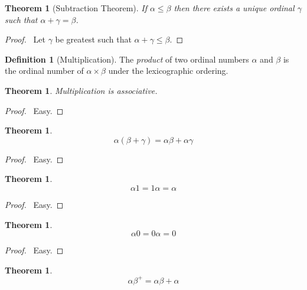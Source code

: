 \documentclass{report}
\let\qed\relax
\newtheorem{theorem}[axiom]{Theorem}
\theoremstyle{definition}
\newtheorem{definition}[axiom]{Definition}
\begin{document}
    \begin{theorem}[Subtraction Theorem]
        If $\alpha \leq \beta$ then there exists a unique ordinal $\gamma$ such that $\alpha + \gamma = \beta$.
    \end{theorem}

    \begin{proof}
        \pf\ Let $\gamma$ be greatest such that $\alpha + \gamma \leq \beta$. \qed
    \end{proof}

    \begin{definition}[Multiplication]
        The \emph{product} of two ordinal numbers $\alpha$ and $\beta$ is the ordinal number of
        $\alpha \times \beta$ under the lexicographic ordering.
    \end{definition}

    \begin{theorem}
        Multiplication is associative.
    \end{theorem}

    \begin{proof}
        \pf\ Easy. \qed
    \end{proof}

    \begin{theorem}
        \[ \alpha (\beta + \gamma) = \alpha \beta + \alpha \gamma \]
    \end{theorem}

    \begin{proof}
        \pf\ Easy. \qed
    \end{proof}

    \begin{theorem}
        \[ \alpha 1 = 1 \alpha = \alpha \]
    \end{theorem}

    \begin{proof}
        \pf\ Easy. \qed
    \end{proof}

    \begin{theorem}
        \[ \alpha 0 = 0 \alpha = 0 \]
    \end{theorem}

    \begin{proof}
        \pf\ Easy. \qed
    \end{proof}

    \begin{theorem}
        \[ \alpha \beta^+ = \alpha \beta + \alpha \]
    \end{theorem}
\end{document}
